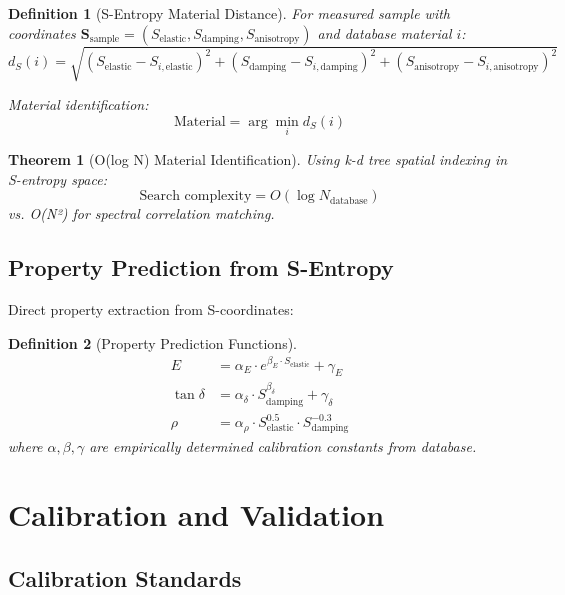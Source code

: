 \documentclass[12pt,a4paper]{article}
\newtheorem{theorem}{Theorem}
\newtheorem{definition}{Definition}
\begin{document}
\begin{definition}[S-Entropy Material Distance]
For measured sample with coordinates $\mathbf{S}_{\text{sample}} = (S_{\text{elastic}}, S_{\text{damping}}, S_{\text{anisotropy}})$ and database material $i$:
\begin{equation}
d_S(i) = \sqrt{(S_{\text{elastic}} - S_{i,\text{elastic}})^2 + (S_{\text{damping}} - S_{i,\text{damping}})^2 + (S_{\text{anisotropy}} - S_{i,\text{anisotropy}})^2}
\end{equation}

Material identification:
\begin{equation}
\text{Material} = \arg\min_i d_S(i)
\end{equation}
\end{definition}

\begin{theorem}[O(log N) Material Identification]
Using k-d tree spatial indexing in S-entropy space:
\begin{equation}
\text{Search complexity} = O(\log N_{\text{database}})
\end{equation}
vs. O(N²) for spectral correlation matching.
\end{theorem}

\subsection{Property Prediction from S-Entropy}

Direct property extraction from S-coordinates:

\begin{definition}[Property Prediction Functions]
\begin{align}
E &= \alpha_E \cdot e^{\beta_E \cdot S_{\text{elastic}}} + \gamma_E \\
\tan\delta &= \alpha_{\delta} \cdot S_{\text{damping}}^{\beta_{\delta}} + \gamma_{\delta} \\
\rho &= \alpha_{\rho} \cdot S_{\text{elastic}}^{0.5} \cdot S_{\text{damping}}^{-0.3}
\end{align}
where $\alpha, \beta, \gamma$ are empirically determined calibration constants from database.
\end{definition}

\section{Calibration and Validation}

\subsection{Calibration Standards}
\end{document}
